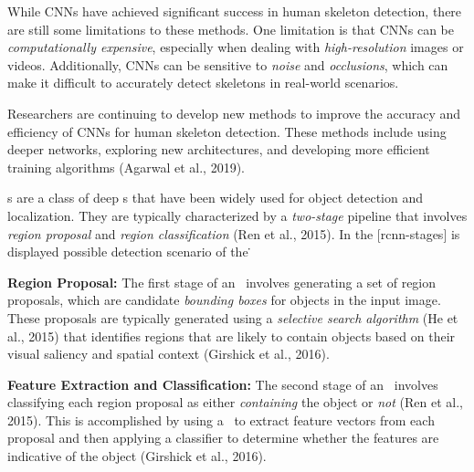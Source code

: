 
While CNNs have achieved significant success in human skeleton detection, there are still some limitations to these methods. One limitation is that CNNs can be {\em computationally expensive}, especially when dealing with {\em high-resolution} images or videos. Additionally, CNNs can be sensitive to {\em noise} and {\em occlusions}, which can make it difficult to accurately detect skeletons in real-world scenarios.

Researchers are continuing to develop new methods to improve the accuracy and efficiency of CNNs for human skeleton detection. These methods include using deeper networks, exploring new architectures, and developing more efficient training algorithms (\scc Agarwal et al., 2019).

\RCNN\-s are a class of deep \CNN\-s that have been widely used for object detection and localization. They are typically characterized by a {\em two-stage} pipeline that involves {\em region proposal} and {\em region classification} (\scc Ren et al., 2015). In the [rcnn-stages] is displayed possible detection scenario of the \RCNN\.

\startitemize[1]
    \item {\bf Region Proposal:} The first stage of an \RCNN\ involves generating a set of region proposals, which are candidate {\em bounding boxes} for objects in the input image. These proposals are typically generated using a {\em selective search algorithm} (\scc He et al., 2015) that identifies regions that are likely to contain objects based on their visual saliency and spatial context (\scc Girshick et al., 2016).
    \item {\bf Feature Extraction and Classification:} The second stage of an \RCNN\ involves classifying each region proposal as either {\em containing} the object or {\em not} (\scc Ren et al., 2015). This is accomplished by using a \CNN\ to extract feature vectors from each proposal and then applying a classifier to determine whether the features are indicative of the object (\scc Girshick et al., 2016).
\stopitemize

